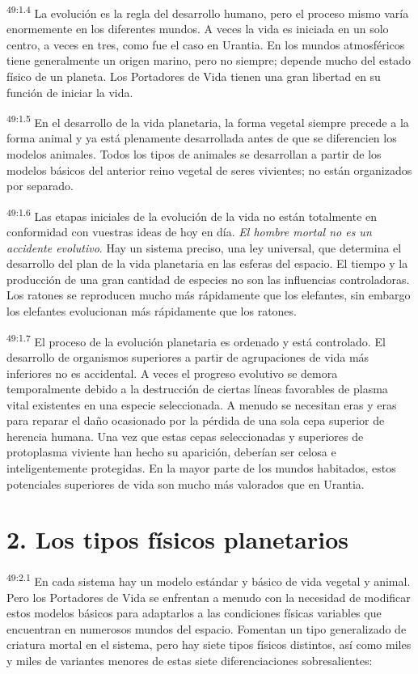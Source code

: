 \par
\textsuperscript{49:1.4} La evolución es la regla del desarrollo humano, pero el proceso mismo varía enormemente en los diferentes mundos. A veces la vida es iniciada en un solo centro, a veces en tres, como fue el caso en Urantia. En los mundos atmosféricos tiene generalmente un origen marino, pero no siempre; depende mucho del estado físico de un planeta. Los Portadores de Vida tienen una gran libertad en su función de iniciar la vida.

\par
\textsuperscript{49:1.5} En el desarrollo de la vida planetaria, la forma vegetal siempre precede a la forma animal y ya está plenamente desarrollada antes de que se diferencien los modelos animales. Todos los tipos de animales se desarrollan a partir de los modelos básicos del anterior reino vegetal de seres vivientes; no están organizados por separado.

\par
\textsuperscript{49:1.6} Las etapas iniciales de la evolución de la vida no están totalmente en conformidad con vuestras ideas de hoy en día. \textit{El hombre mortal no es un accidente evolutivo}. Hay un sistema preciso, una ley universal, que determina el desarrollo del plan de la vida planetaria en las esferas del espacio. El tiempo y la producción de una gran cantidad de especies no son las influencias controladoras. Los ratones se reproducen mucho más rápidamente que los elefantes, sin embargo los elefantes evolucionan más rápidamente que los ratones.

\par
\textsuperscript{49:1.7} El proceso de la evolución planetaria es ordenado y está controlado. El desarrollo de organismos superiores a partir de agrupaciones de vida más inferiores no es accidental. A veces el progreso evolutivo se demora temporalmente debido a la destrucción de ciertas líneas favorables de plasma vital existentes en una especie seleccionada. A menudo se necesitan eras y eras para reparar el daño ocasionado por la pérdida de una sola cepa superior de herencia humana. Una vez que estas cepas seleccionadas y superiores de protoplasma viviente han hecho su aparición, deberían ser celosa e inteligentemente protegidas. En la mayor parte de los mundos habitados, estos potenciales superiores de vida son mucho más valorados que en Urantia.

\section*{2. Los tipos físicos planetarios}
\par
\textsuperscript{49:2.1} En cada sistema hay un modelo estándar y básico de vida vegetal y animal. Pero los Portadores de Vida se enfrentan a menudo con la necesidad de modificar estos modelos básicos para adaptarlos a las condiciones físicas variables que encuentran en numerosos mundos del espacio. Fomentan un tipo generalizado de criatura mortal en el sistema, pero hay siete tipos físicos distintos, así como miles y miles de variantes menores de estas siete diferenciaciones sobresalientes:

